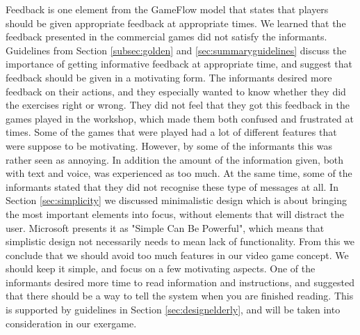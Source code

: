 Feedback is one element from the GameFlow model that states that players should be given appropriate feedback at appropriate times. We learned that the feedback presented in the commercial games did not satisfy the informants. Guidelines from Section \ref{subsec:golden} and \ref{sec:summaryguidelines} discuss the importance of getting informative feedback at appropriate time, and suggest that feedback should be given in a motivating form. The informants desired more feedback on their actions, and they especially wanted to know whether they did the exercises right or wrong. They did not feel that they got this feedback in the games played in the workshop, which made them both confused and frustrated at times. Some of the games that were played had a lot of different features that were suppose to be motivating. However, by some of the informants this was rather seen as annoying. In addition the amount of the information given, both with text and voice, was experienced as too much. At the same time, some of the informants stated that they did not recognise these type of messages at all. In Section \ref{sec:simplicity} we discussed minimalistic design which is about bringing the most important elements into focus, without elements that will distract the user. Microsoft presents it as "Simple Can Be Powerful", which means that simplistic design not necessarily needs to mean lack of functionality. From this we conclude that we should avoid too much features in our video game concept. We should keep it simple, and focus on a few motivating aspects. One of the informants desired more time to read information and instructions, and suggested that there should be a way to tell the system when you are finished reading. This is supported by guidelines in Section \ref{sec:designelderly}, and will be taken into consideration in our exergame. 

